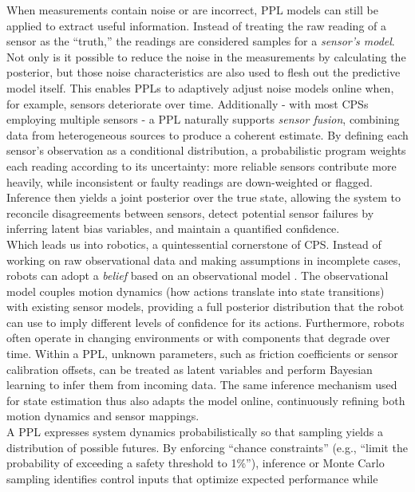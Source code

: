 \begin{multicols}{2}
  When measurements contain noise or are incorrect, PPL models can still be applied to extract useful information. Instead of treating the raw reading of a sensor as the “truth,”
  the readings are considered samples for a \textit{sensor’s model}. Not only is it possible to reduce the noise in the measurements by calculating the posterior,
  but those noise characteristics are also used to flesh out the predictive model itself.
  This enables PPLs to adaptively adjust noise models online when, for example, sensors deteriorate over time.
  Additionally - with most CPSs employing multiple sensors - a PPL naturally supports \textit{sensor fusion}, \cite{cpsSensorFusion} combining data from heterogeneous sources
  to produce a coherent estimate. By defining each sensor's observation as a conditional distribution, a probabilistic program
  weights each reading according to its uncertainty: more reliable sensors contribute more heavily, while inconsistent or faulty readings are down-weighted or flagged.
  Inference then yields a joint posterior over the true state, allowing the system to reconcile disagreements between sensors, detect potential sensor failures by inferring
  latent bias variables, and maintain a quantified confidence.
  \\
  Which leads us into robotics, a quintessential cornerstone of CPS. Instead of working on raw observational data and making assumptions in incomplete cases, robots can adopt
  a \textit{belief} based on an observational model \cite{cpsProbabilisticRobotics}. The observational model couples motion dynamics (how actions translate into state
  transitions) with existing sensor models, providing a full posterior distribution that the robot can use to imply different levels of confidence for its actions.
  Furthermore, robots often operate in changing environments or with components that degrade over time. Within a PPL, unknown parameters, such as friction
  coefficients or sensor calibration offsets, can be treated as latent variables and perform Bayesian learning to infer them from incoming data. The same inference mechanism used for state
  estimation thus also adapts the model online, continuously refining both motion dynamics and sensor mappings.
  \\
  A PPL expresses system dynamics probabilistically so that sampling yields a distribution of possible futures. \cite{cpsPredictiveControl} By enforcing “chance constraints”
  (e.g., “limit the probability of exceeding a safety threshold to 1\%”), inference or Monte Carlo sampling identifies control inputs that optimize expected performance while

\end{multicols}
